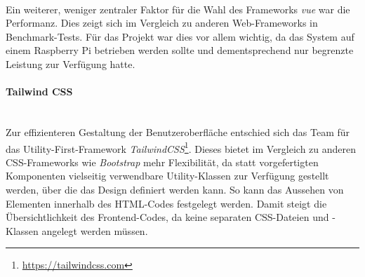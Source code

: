 \documentclass[10pt, a4paper]{article}
\begin{document}
\paragraph*{}
Ein weiterer, weniger zentraler Faktor für die Wahl des Frameworks \textit{vue} war die Performanz.
Dies zeigt sich im Vergleich zu anderen Web-Frameworks in Benchmark-Tests.\cite{Vue_Performance}
Für das Projekt war dies vor allem wichtig, da das System auf einem Raspberry Pi betrieben werden sollte
 und dementsprechend nur begrenzte Leistung zur Verfügung hatte.

\paragraph*{Tailwind CSS} $~$ \\
Zur effizienteren Gestaltung der Benutzeroberfläche entschied sich das Team für das Utility-First-Framework \textit{TailwindCSS}\footnote{\raggedright\url{https://tailwindcss.com}}.
Dieses bietet im Vergleich zu anderen CSS-Frameworks wie \textit{Bootstrap} mehr Flexibilität, da statt vorgefertigten Komponenten vielseitig verwendbare Utility-Klassen zur Verfügung gestellt werden,
über die das Design definiert werden kann. So kann das Aussehen von Elementen innerhalb des HTML-Codes festgelegt werden.
Damit steigt die Übersichtlichkeit des Frontend-Codes, da keine separaten CSS-Dateien und -Klassen angelegt werden müssen.
\cite{Tailwind_Vorteile}
\end{document}
